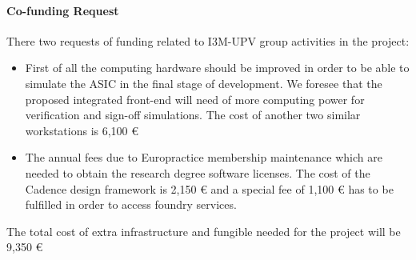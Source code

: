 \paragraph{Co-funding Request}
\par There two requests of funding related to I3M-UPV group activities in the project:
\begin{itemize}
\item First of all the computing hardware should be improved in order to be able to simulate the ASIC in the final stage of development. We foresee that the proposed integrated front-end will need of more computing power for verification and sign-off simulations. The cost of another two similar workstations is 6,100 €
\item The annual fees due to Europractice membership maintenance which are needed to obtain the research degree software licenses. The cost of the Cadence design framework is 2,150 € and a special fee of 1,100 € has to be fulfilled in order to access foundry services.
\end{itemize}

\par The total cost of extra infrastructure and fungible needed for the project will be 9,350 €